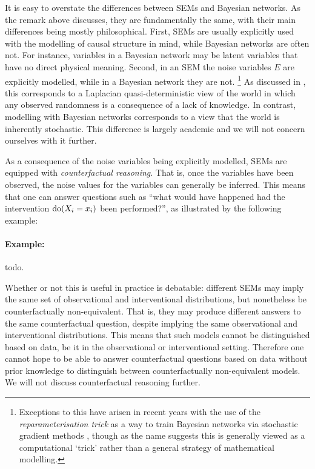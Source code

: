 It is easy to overstate the differences between SEMs and Bayesian networks. As the remark above discusses, they are fundamentally the same, with their main differences being mostly philosophical.
First, SEMs are usually explicitly used with the modelling of causal structure in mind, while Bayesian networks are often not. For instance, variables in a Bayesian network may be latent variables that have no direct physical meaning.
Second, in an SEM the noise variables $E$ are explicitly modelled, while in a Bayesian network they are not. \footnote{Exceptions to this have arisen in recent years with the use of the \emph{reparameterisation trick} as a way to train Bayesian networks via stochastic gradient methods \citep{kingma, rezende}, though as the name suggests this is generally viewed as a computational `trick' rather than a general strategy of mathematical modelling.}
As discussed in \cite{pearl}, this corresponds to a Laplacian quasi-deterministic view of the world in which any observed randomness is a consequence of a lack of knowledge. In contrast, modelling with Bayesian networks corresponds to a view that the world is inherently stochastic. This difference is largely academic and we will not concern ourselves with it further.

As a consequence of the noise variables being explicitly modelled, SEMs are equipped with \emph{counterfactual reasoning}. That is, once the variables have been observed, the noise values for the variables can generally be inferred. This means that one can answer questions such as ``what would have happened had the intervention $\operatorname{do}(X_i=x_i)$ been performed?'', as illustrated by the following example:

\paragraph{Example:} todo.

Whether or not this is useful in practice is debatable: different SEMs may imply the same set of observational and interventional distributions, but nonetheless be counterfactually non-equivalent. That is, they may produce different answers to the same counterfactual question, despite implying the same observational and interventional distributions. This means that such models cannot be distinguished based on data, be it in the observational or interventional setting. Therefore one cannot hope to be able to answer counterfactual questions based on data without prior knowledge to distinguish between counterfactually non-equivalent models.
We will not discuss counterfactual reasoning further.


